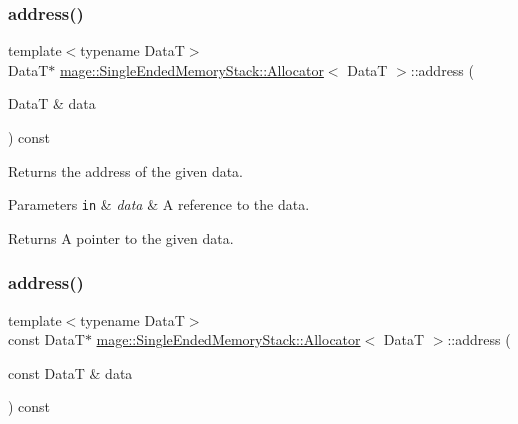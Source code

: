 \subsubsection{\texorpdfstring{address()}{address()}\hspace{0.1cm}{\footnotesize\ttfamily [1/2]}}
{\footnotesize\ttfamily template$<$typename DataT$>$ \\
DataT$\ast$ \hyperlink{structmage_1_1_single_ended_memory_stack_1_1_allocator}{mage\+::\+Single\+Ended\+Memory\+Stack\+::\+Allocator}$<$ DataT $>$\+::address (\begin{DoxyParamCaption}\item[{DataT \&}]{data }\end{DoxyParamCaption}) const\hspace{0.3cm}{\ttfamily [noexcept]}}

Returns the address of the given data.


\begin{DoxyParams}[1]{Parameters}
\mbox{\tt in}  & {\em data} & A reference to the data. \\
\hline
\end{DoxyParams}
\begin{DoxyReturn}{Returns}
A pointer to the given data. 
\end{DoxyReturn}
\hypertarget{structmage_1_1_single_ended_memory_stack_1_1_allocator_abe5c2b2a569ff0c61f7c4c7ee4625b05}{}\label{structmage_1_1_single_ended_memory_stack_1_1_allocator_abe5c2b2a569ff0c61f7c4c7ee4625b05} 
\subsubsection{\texorpdfstring{address()}{address()}\hspace{0.1cm}{\footnotesize\ttfamily [2/2]}}
{\footnotesize\ttfamily template$<$typename DataT$>$ \\
const DataT$\ast$ \hyperlink{structmage_1_1_single_ended_memory_stack_1_1_allocator}{mage\+::\+Single\+Ended\+Memory\+Stack\+::\+Allocator}$<$ DataT $>$\+::address (\begin{DoxyParamCaption}\item[{const DataT \&}]{data }\end{DoxyParamCaption}) const\hspace{0.3cm}{\ttfamily [noexcept]}}

